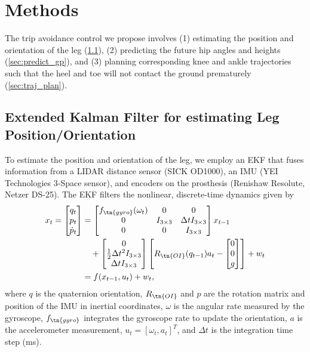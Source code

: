\section{Methods}
The trip avoidance control we propose involves (1) estimating the position and
orientation of the leg (\cref{sec:hip_kalman}), (2) predicting the future hip
angles and heights (\cref{sec:predict_gp}), and (3) planning corresponding knee
and ankle trajectories such that the heel and toe will not contact the ground
prematurely (\cref{sec:traj_plan}).

\subsection{Extended Kalman Filter for estimating Leg Position/Orientation}
\label{sec:hip_kalman}

To estimate the position and orientation of the leg, we employ an EKF that fuses
information from a LIDAR distance sensor (SICK OD1000), an IMU (YEI Technologies
3-Space sensor), and encoders on the prosthesis (Renishaw Resolute, Netzer
DS-25). The EKF filters the nonlinear, discrete-time dynamics given by
\begin{align}
    x_{t} = \begin{bmatrix} q_t \\ p_t \\ \dot{p}_t \end{bmatrix}
        &= \begin{bmatrix} f_\tn{gyro}(\omega_t) & 0 & 0 \\
            0 & I_{3\times3} & \Delta t  I_{3\times3}\\
            0 & 0 & I_{3\times3} \end{bmatrix} x_{t-1} \notag \\
        &\quad+ \begin{bmatrix} 0 \\ \frac{1}{2} \Delta t^2 I_{3\times3} \\ 
            \Delta t I_{3\times3} \end{bmatrix} 
        \begin{bmatrix} R_\tn{OI}(q_{t-1}) a_t - \begin{bmatrix} 0 \\ 0 \\ g 
            \end{bmatrix} \end{bmatrix} + w_t \label{eq:dynamics}\\
            &= f(x_{t-1}, u_t) + w_t  \notag ,
\end{align}
where $q$ is the quaternion orientation, $R_\tn{OI}$ and $p$ are the rotation
matrix and position of the IMU in inertial coordinates, $\omega$ is the angular
rate measured by the gyroscope, $f_\tn{gyro}$ integrates the gyroscope rate to
update the orientation, $a$ is the accelerometer measurement, $u_t =
\left[\omega_t, a_t \right]^T$, and $\Delta t$ is the integration time step
(\unit[1]{ms}). 

